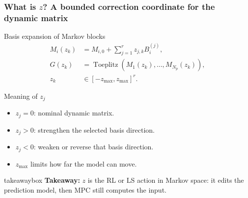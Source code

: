 \documentclass[aspectratio=169]{beamer}
\newcommand{\Toeplitz}{\operatorname{Toeplitz}}
\newcommand{\takeawaybox}[1]{%
\vspace{0.02cm}
\begin{center}
\begin{beamercolorbox}[wd=0.94\textwidth,sep=3pt,center,rounded=true,shadow=false]{takeawaybox}
\scriptsize
\textbf{\textcolor{maroon1}{Takeaway:}} #1
\end{beamercolorbox}
\end{center}
}
\begin{document}
\begin{frame}
\frametitle{\large \textbf{What is \(z\)? A bounded correction coordinate for the dynamic matrix}}
\scriptsize

\begin{block}{Basis expansion of Markov blocks}
\begin{align*}
M_i(z_k) &= M_{i,0}+\sum_{j=1}^{r}z_{j,k}B_i^{(j)},\\
G(z_k) &= \Toeplitz\left(M_1(z_k),\ldots,M_{N_p}(z_k)\right),\\
z_k &\in[-z_{\max},z_{\max}]^r.
\end{align*}
\end{block}

\begin{block}{Meaning of \(z_j\)}
\begin{itemize}\justifying
  \setlength\itemsep{0.35ex}
  \item \(z_j=0\): nominal dynamic matrix.
  \item \(z_j>0\): strengthen the selected basis direction.
  \item \(z_j<0\): weaken or reverse that basis direction.
  \item \(z_{\max}\) limits how far the model can move.
\end{itemize}
\end{block}

\takeawaybox{\(z\) is the RL or LS action in Markov space: it edits the prediction model, then MPC still computes the input.}
\end{frame}
\end{document}
